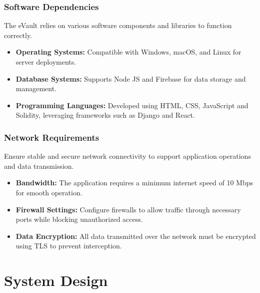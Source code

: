 \documentclass[12pt,a4paper]{report}
\begin{document}
   \subsection{Software Dependencies}
   The eVault relies on various software components and libraries to function correctly.
   \begin{itemize}
       \item \textbf{Operating Systems:} Compatible with Windows, macOS, and Linux for server deployments.
       \item \textbf{Database Systems:} Supports Node JS\cite{nodedocs} and Firebase for data storage and management.
       \item \textbf{Programming Languages:} Developed using HTML\cite{duckett2011html}, CSS\cite{meyer2017css}, JavaScript\cite{hav2018eloquent} and Solidity\cite{soliditydocs}, leveraging frameworks such as Django and React.
   \end{itemize}
   
   \subsection{Network Requirements}
   Ensure stable and secure network connectivity to support application operations and data transmission.
   \begin{itemize}
       \item \textbf{Bandwidth:} The application requires a minimum internet speed of 10 Mbps for smooth operation.
       \item \textbf{Firewall Settings:} Configure firewalls to allow traffic through necessary ports while blocking unauthorized access.
       \item \textbf{Data Encryption:} All data transmitted over the network must be encrypted using TLS to prevent interception.
   \end{itemize}





\chapter{System Design}
\end{document}
